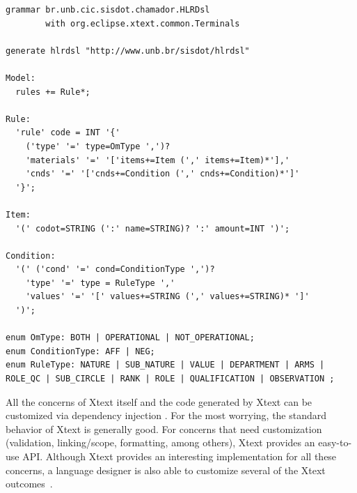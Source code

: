 \begin{lstlisting}[frame=single, float=*t, language=Xtext, caption={\it Xtext grammar defining the DSL structure}, label={code:gramatica}]
grammar br.unb.cic.sisdot.chamador.HLRDsl 
        with org.eclipse.xtext.common.Terminals
        
generate hlrdsl "http://www.unb.br/sisdot/hlrdsl"

Model:
  rules += Rule*;

Rule:
  'rule' code = INT '{'
    ('type' '=' type=OmType ',')?
    'materials' '=' '['items+=Item (',' items+=Item)*'],'
    'cnds' '=' '['cnds+=Condition (',' cnds+=Condition)*']'
  '}';

Item: 
  '(' codot=STRING (':' name=STRING)? ':' amount=INT ')';

Condition:
  '(' ('cond' '=' cond=ConditionType ',')?
    'type' '=' type = RuleType ','
    'values' '=' '[' values+=STRING (',' values+=STRING)* ']'
  ')';

enum OmType: BOTH | OPERATIONAL | NOT_OPERATIONAL;
enum ConditionType: AFF | NEG;
enum RuleType: NATURE | SUB_NATURE | VALUE | DEPARTMENT | ARMS | ROLE_QC | SUB_CIRCLE | RANK | ROLE | QUALIFICATION | OBSERVATION ;
\end{lstlisting}





All the concerns of Xtext itself and the code generated by Xtext can be customized via dependency injection \cite{prasanna2009}. For the most worrying, the standard behavior of Xtext is generally good. For concerns that need customization (validation, linking/scope, formatting, among others), Xtext provides an easy-to-use API. Although Xtext provides an interesting implementation for all these concerns, a language designer is also able to customize several of the Xtext outcomes~\cite{bettini2016}.


